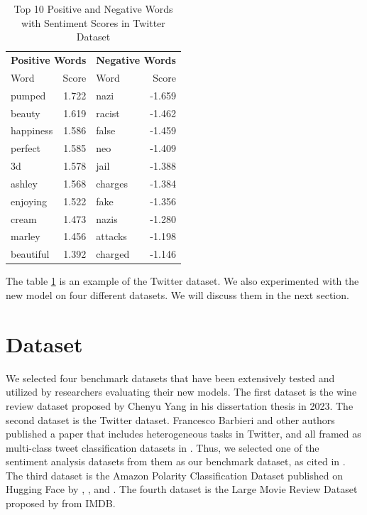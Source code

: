 \documentclass{article}
\begin{document}
\begin{table}[htbp]
\centering
\caption{Top 10 Positive and Negative Words with Sentiment Scores in Twitter Dataset}
\label{tab:sentiment_words}
\begin{tabular}{l r l r}
\toprule
\multicolumn{2}{c}{\textbf{Positive Words}} & \multicolumn{2}{c}{\textbf{Negative Words}} \\
\cmidrule(lr){1-2} \cmidrule(lr){3-4}
Word & Score & Word & Score \\
\midrule
pumped      & 1.722 & nazi     & -1.659 \\
beauty    & 1.619 & racist     & -1.462 \\
happiness      & 1.586 & false        & -1.459 \\
perfect        & 1.585 & neo   & -1.409 \\
3d      & 1.578 & jail      & -1.388 \\
ashley      & 1.568 & charges    & -1.384 \\
enjoying        & 1.522 & fake     & -1.356 \\
cream        & 1.473 & nazis   & -1.280 \\
marley         & 1.456 & attacks     & -1.198 \\
beautiful      & 1.392 & charged     & -1.146 \\
\bottomrule
\end{tabular}
\label{tab:PN}
\end{table}
The table \ref{tab:PN} is an example of the Twitter dataset. We also experimented with the new model on four different datasets. We will discuss them in the next section. 

\section{Dataset}
We selected four benchmark datasets that have been extensively tested and utilized by researchers evaluating their new models. The first dataset is the wine review dataset proposed by Chenyu Yang in his dissertation thesis \cite{chenyu} in 2023. The second dataset is the Twitter dataset. Francesco Barbieri and other authors published a paper that includes heterogeneous tasks in Twitter, and all framed as multi-class tweet classification datasets in \cite{barbieri2020tweeteval}. Thus, we selected one of the sentiment analysis datasets from them as our benchmark dataset, as cited in \cite{rosenthal2017semeval}. The third dataset is the Amazon Polarity Classification Dataset published on Hugging Face by \cite{McAuley2013HiddenFA}, \cite{muennighoff2022mteb}, and \cite{enevoldsen2025mmtebmassivemultilingualtext}. The fourth dataset is the Large Movie Review Dataset proposed by \cite{maas-EtAl:2011:ACL-HLT2011} from IMDB.
\end{document}
